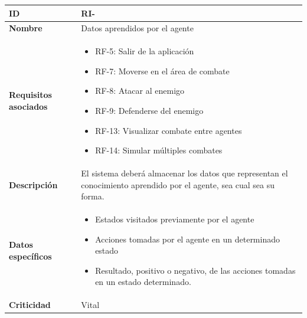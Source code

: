 \begin{center}
	\begin{tabular}{ | p{4.5cm} | p{10cm} | } 
		\hline
		
		\textbf{ID} & RI-\arabic{contador_requisitos_de_informacion}
		{contador_requisitos_de_informacion} \\
		
		\hline 
		
		\textbf{Nombre} &
		Datos aprendidos por el agente\\ 
		
		\hline
		
		\textbf{Requisitos asociados} & 
		\begin{itemize}
			\item RF-5: Salir de la aplicación
			\item RF-7: Moverse en el área de combate
			\item RF-8: Atacar al enemigo
			\item RF-9: Defenderse del enemigo
			\item RF-13: Visualizar combate entre agentes
			\item RF-14: Simular múltiples combates
		\end{itemize}\\
		
		\hline
		
		\textbf{Descripción} & 
		El sistema deberá almacenar los datos que representan el conocimiento aprendido por el agente, sea cual sea su forma.\\
		
		\hline 
		
		\textbf{Datos específicos} &
		\begin{itemize}
			\item Estados visitados previamente por el agente
			\item Acciones tomadas por el agente en un determinado estado
			\item Resultado, positivo o negativo, de las acciones tomadas en un estado determinado.
		\end{itemize}\\
		
		\hline 
		
		\textbf{Criticidad} &
		Vital\\
		
		\hline
	\end{tabular}
\end{center}

